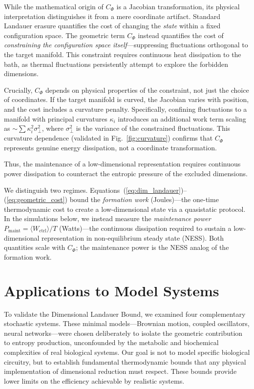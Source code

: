 \documentclass[aps,pre,twocolumn,superscriptaddress,floatfix]{revtex4-2}
\begin{document}
While the mathematical origin of $C_\Phi$ is a Jacobian transformation, its physical interpretation distinguishes it from a mere coordinate artifact. Standard Landauer erasure quantifies the cost of changing the \textit{state} within a fixed configuration space. The geometric term $C_\Phi$ instead quantifies the cost of \textit{constraining the configuration space itself}---suppressing fluctuations orthogonal to the target manifold. This constraint requires continuous heat dissipation to the bath, as thermal fluctuations persistently attempt to explore the forbidden dimensions.

Crucially, $C_\Phi$ depends on physical properties of the constraint, not just the choice of coordinates. If the target manifold is curved, the Jacobian varies with position, and the cost includes a curvature penalty. Specifically, confining fluctuations to a manifold with principal curvatures $\kappa_i$ introduces an additional work term scaling as $\sim \sum \kappa_i^2 \sigma_\perp^2$, where $\sigma_\perp^2$ is the variance of the constrained fluctuations. This curvature dependence (validated in Fig.~\ref{fig:curvature}) confirms that $C_\Phi$ represents genuine energy dissipation, not a coordinate transformation.

Thus, the maintenance of a low-dimensional representation requires continuous power dissipation to counteract the entropic pressure of the excluded dimensions.

We distinguish two regimes. Equations~(\ref{eq:dim_landauer})--(\ref{eq:geometric_cost}) bound the \textit{formation work} (Joules)---the one-time thermodynamic cost to create a low-dimensional state via a quasistatic protocol. In the simulations below, we instead measure the \textit{maintenance power} $P_{\text{maint}} = \langle W_{\text{ctrl}} \rangle / T$ (Watts)---the continuous dissipation required to sustain a low-dimensional representation in non-equilibrium steady state (NESS). Both quantities scale with $C_\Phi$; the maintenance power is the NESS analog of the formation work.

\section{Applications to Model Systems}

To validate the Dimensional Landauer Bound, we examined four complementary stochastic systems. These minimal models---Brownian motion, coupled oscillators, neural networks---were chosen deliberately to isolate the geometric contribution to entropy production, unconfounded by the metabolic and biochemical complexities of real biological systems. Our goal is not to model specific biological circuitry, but to establish fundamental thermodynamic bounds that any physical implementation of dimensional reduction must respect. These bounds provide lower limits on the efficiency achievable by realistic systems.
\end{document}

